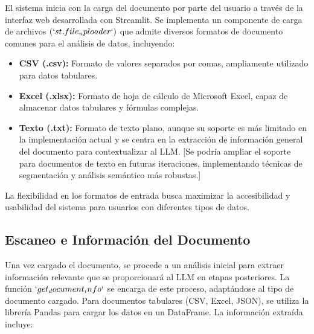 El sistema inicia con la carga del documento por parte del usuario a través de la interfaz web desarrollada con Streamlit.  Se implementa un componente de carga de archivos $(`st.file_uploader`)$ que admite diversos formatos de documento comunes para el análisis de datos, incluyendo:
\begin{itemize}
	\item \textbf{CSV (.csv):}  Formato de valores separados por comas, ampliamente utilizado para datos tabulares.
	\item \textbf{Excel (.xlsx):}  Formato de hoja de cálculo de Microsoft Excel, capaz de almacenar datos tabulares y fórmulas complejas.
	\item \textbf{Texto (.txt):}  Formato de texto plano, aunque su soporte es más limitado en la implementación actual y se centra en la extracción de información general del documento para contextualizar al LLM.  [Se podría ampliar el soporte para documentos de texto en futuras iteraciones, implementando técnicas de segmentación y análisis semántico más robustas.]
\end{itemize}
La flexibilidad en los formatos de entrada busca maximizar la accesibilidad y usabilidad del sistema para usuarios con diferentes tipos de datos.

\subsection{Escaneo e Información del Documento}

Una vez cargado el documento, se procede a un análisis inicial para extraer información relevante que se proporcionará al LLM en etapas posteriores. La función $`get_document_info`$ se encarga de este proceso, adaptándose al tipo de documento cargado.  Para documentos tabulares (CSV, Excel, JSON), se utiliza la librería Pandas para cargar los datos en un DataFrame.  La información extraída incluye:

